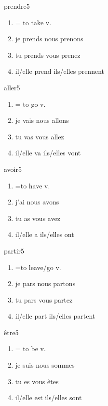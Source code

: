 \documentclass[./templates/main.tex]{subfiles}
\begin{document}
\begin{word}{prendre}{}{5}\label{wo:prendre}
  \begin{enumerate}[label=(\arabic*)]
    \item = to take v.
    \item je prends nous prenons
    \item tu prends vous prenez
    \item il/elle prend ils/elles prennent
  \end{enumerate}
\end{word}
\begin{word}{aller}{}{5}\label{wo:aller}
  \begin{enumerate}[label=(\arabic*)]
    \item = to go v.
    \item je vais nous allons
    \item tu vas vous allez
    \item il/elle va ils/elles vont
  \end{enumerate}
\end{word}
\begin{word}{avoir}{}{5}\label{wo:avoir}
  \begin{enumerate}[label=(\arabic*)]
    \item =to have v.
    \item j'ai nous avons
    \item tu as vous avez
    \item il/elle a ils/elles ont
  \end{enumerate}
\end{word}
\begin{word}{partir}{}{5}\label{wo:partir}
  \begin{enumerate}[label=(\arabic*)]
    \item =to leave/go v.
    \item je pars nous partons
    \item tu pars vous partez
    \item il/elle part ils/elles partent
  \end{enumerate}
\end{word}
\begin{word}{être}{}{5}\label{wo:être}
  \begin{enumerate}[label=(\arabic*)]
    \item = to be v.
    \item je suis nous sommes
    \item tu es vous êtes
    \item il/elle est ils/elles sont
  \end{enumerate}
\end{word}
\end{document}
